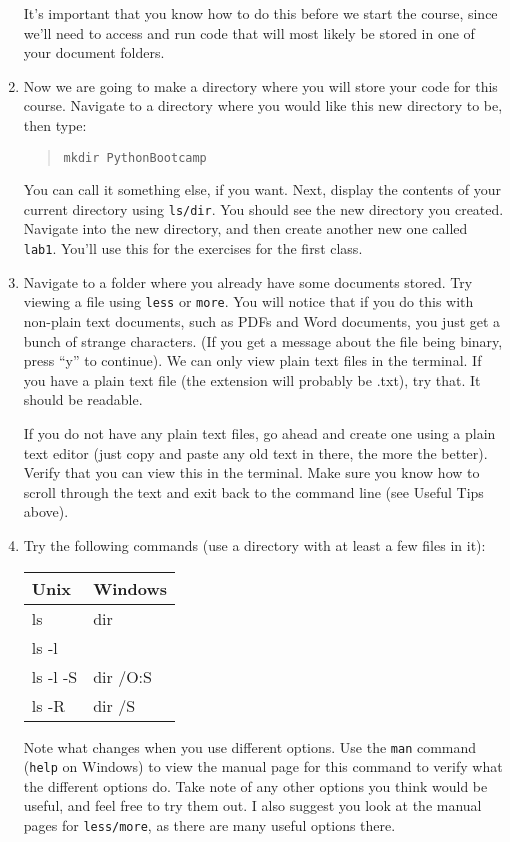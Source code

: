 \documentclass[english,12pt]{article}
\begin{document}
\begin{enumerate}
It's important that you know how to do this before we start the course, since we'll need to access and run code that will most likely be stored in one of your document folders.

\item Now we are going to make a directory where you will store your code for this course. Navigate to a directory where you would like this new directory to be, then type:
\begin{quote}
\begin{verbatim}
mkdir PythonBootcamp
\end{verbatim}
\end{quote}
You can call it something else, if you want. Next, display the contents of your current directory using \texttt{ls/dir}. You should see the new directory you created. Navigate into the new directory, and then create another new one called \texttt{lab1}. You'll use this for the exercises for the first class.

\item Navigate to a folder where you already have some documents stored. Try viewing a file using \texttt{less} or \texttt{more}. You will notice that if you do this with non-plain text documents, such as PDFs and Word documents, you just get a bunch of strange characters. (If you get a message about the file being binary, press ``y'' to continue). We can only view plain text files in the terminal. If you have a plain text file (the extension will probably be .txt), try that. It should be readable. 

If you do not have any plain text files, go ahead and create one using a plain text editor (just copy and paste any old text in there, the more the better). Verify that you can view this in the terminal. Make sure you know how to scroll through the text and exit back to the command line (see Useful Tips above).

\item Try the following commands (use a directory with at least a few files in it): 

\begin{center}
\begin{tabular}{p{5cm} | p{5cm}}
	Unix & Windows \\ \hline
	ls & dir \\
	ls -l &  \\
	ls -l -S & dir /O:S \\
	ls -R & dir /S
\end{tabular}
\end{center}

Note what changes when you use different options. Use the \texttt{man} command (\texttt{help} on Windows) to view the manual page for this command to verify what the different options do. Take note of any other options you think would be useful, and feel free to try them out. I also suggest you look at the manual pages for \texttt{less/more}, as there are many useful options there.


\end{enumerate}
\end{document}
